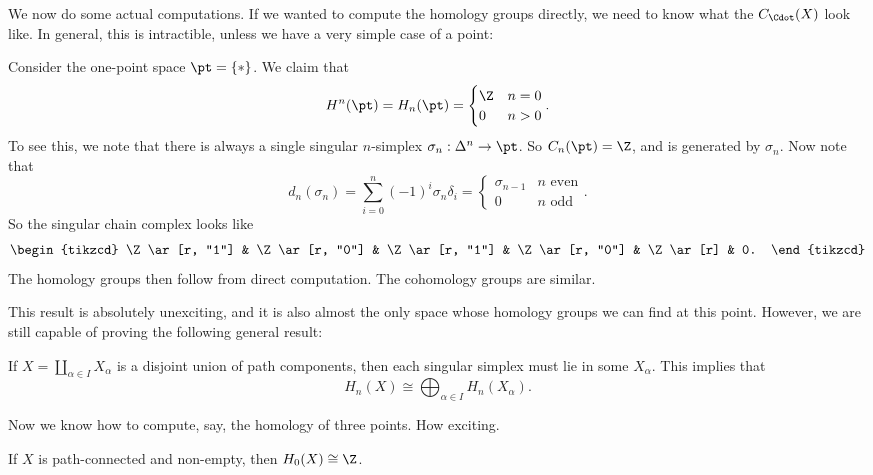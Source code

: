 \documentclass[a4paper]{article}
\theoremstyle{definition}
\begin{document}
We now do some actual computations. If we wanted to compute the homology groups directly, we need to know what the $C_\Cdot(X)$ look like. In general, this is intractible, unless we have a very simple case of a point:
\begin{eg}
  Consider the one-point space $\pt = \{*\}$. We claim that
  \[
    H^n(\pt) = H_n(\pt) =
    \begin{cases}
      \Z & n = 0\\
      0 & n > 0
    \end{cases}.
  \]
  To see this, we note that there is always a single singular $n$-simplex $\sigma_n: \Delta^n \to \pt$. So $C_n(\pt) = \Z$, and is generated by $\sigma_n$. Now note that
  \[
    d_n(\sigma_n) = \sum_{i = 0}^n (-1)^i \sigma_n \delta_i =
    \begin{cases}
      \sigma_{n - 1} & n\text{ even}\\
      0 & n\text{ odd}
    \end{cases}.
  \]
  So the singular chain complex looks like
  \[
    \begin{tikzcd}
      \Z \ar[r, "1"] & \Z\ar[r, "0"] & \Z \ar[r, "1"] & \Z \ar[r, "0"] & \Z \ar[r] & 0.
    \end{tikzcd}
  \]
  The homology groups then follow from direct computation. The cohomology groups are similar.
\end{eg}
This result is absolutely unexciting, and it is also almost the only space whose homology groups we can find at this point. However, we are still capable of proving the following general result:

\begin{eg}
  If $X = \coprod_{\alpha \in I} X_\alpha$ is a disjoint union of path components, then each singular simplex must lie in some $X_\alpha$. This implies that
  \[
    H_n(X) \cong \bigoplus_{\alpha \in I} H_n(X_\alpha).
  \]
\end{eg}
Now we know how to compute, say, the homology of three points. How exciting.

\begin{lemma}
  If $X$ is path-connected and non-empty, then $H_0(X) \cong \Z$.
\end{lemma}
\end{document}
